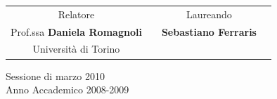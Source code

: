 \documentclass[a4paper,11pt,oneside]{report}
\begin{document}
\begin{titlepage}
\vspace{1cm}
\begin{figure}[!h]
\begin{center}
\end{center}
\end{figure}
\vspace{1cm}



\begin{tabular}{c p{3.3cm}c c}



Relatore & & Laureando \\
Prof.ssa \textbf{Daniela Romagnoli} & & \textbf{Sebastiano Ferraris}\\
{\small Università di Torino} & & { }\\

\end{tabular}
\vspace{1 cm}

\begin{center}
\large{Sessione di marzo 2010 \\ Anno Accademico 2008-2009}
\end{center}
\par
\vfill\par 
\clearpage
\endgroup


\end{titlepage}
\end{document}
